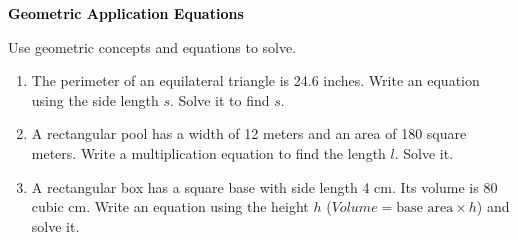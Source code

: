 \documentclass[12pt, letterpaper, fleqn]{article}
\begin{document}
\newpage

\begin{tcolorbox}[colback=black!10]
\large\textcolor{black}{\textbf{Geometric Application Equations}}
\end{tcolorbox}

\noindent
Use geometric concepts and equations to solve.

\vspace{3mm}

\begin{enumerate}[itemsep=2.2cm, leftmargin=0.6cm]

\item The perimeter of an equilateral triangle is 24.6 inches. Write an equation using the side length $s$. Solve it to find $s$.

\vspace{2.2cm}

\item A rectangular pool has a width of 12 meters and an area of 180 square meters. Write a multiplication equation to find the length $l$. Solve it.

\vspace{2.2cm}

\item A rectangular box has a square base with side length 4 cm. Its volume is 80 cubic cm. Write an equation using the height $h$ ($Volume = \text{base area} \times h$) and solve it.

\vspace{2.2cm}

\end{enumerate}
\end{document}
